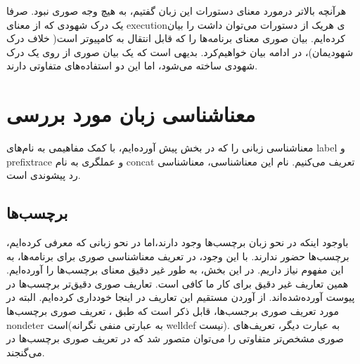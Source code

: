 هر‌آنچه بالاتر در‌مورد معنای دستورات این زبان گفتیم، به هیچ وجه صوری نبود. صرفا یک درک شهودی‌ که از معنای \gls*{execution}ی هر‌یک از دستورات می‌توان داشت را بیان کرده‌ایم. بیان صوری معنای برنامه‌ها را که قابل انتقال به کامپیوتر‌ است( خلاف درک شهودیمان)، در ادامه بیان خواهیم‌کرد. بدیهی است که یک بیان صوری از روی یک درک شهودی ساخته می‌شود، اما این دو استفاده‌های متفاوتی دارند.

\section{معناشناسی زبان مورد بررسی‬}
معناشناسی زبانی را که در بخش پیش آورده‌ایم، با کمک مفاهیمی به نام‌های \gls{label} و \gls{prefixtrace} و عملگری به نام \gls{concat} تعریف می‌کنیم. نام این معناشناسی، معناشناسی رد پیشوندی است.\\

\subsection{برچسب‌ها}

با‌وجود اینکه در نحو زبان  برچسب‌ها وجود دارند،اما در نحو زبانی که معرفی کرده‌ایم، برچسب‌ها حضور ندارند. با این وجود، در تعریف معناشناسی صوری برای برنامه‌ها، به این مفهوم نیاز داریم. در این بخش، به ‌طور غیر دقیق معنای برچسب‌ها را آورده‌ایم. همین تعاریف غیر دقیق برای کار ما کافی است. تعاریف صوری دقیق‌تر برچسب‌ها در پیوست \cite{calcul} آورده‌شده‌اند. از آوردن مستقیم این تعاریف در اینجا خود‌داری کرده‌ایم. البته در مورد تعریف صوری برجسب‌ها، قابل ذکر است که طبق \cite{cousotbook}، تعریف صوری برچسب‌ها \gls*{nondeter} است(به عبارتی منفی نگرانه \gls*{welldef} نیست). به عبارت دیگر، تعریف‌های صوری مشخص‌تر متفاوتی را می‌توان متصور شد که در تعریف صوری برچسب‌ها در \cite{cousotbook} می‌گنجند.

